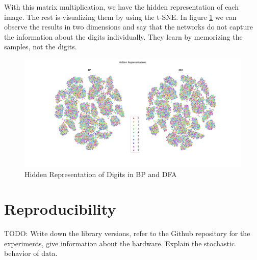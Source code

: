\documentclass[a4paper, nobind]{templates/ociamthesis}
\newcommand*{\bibtitle}{References}
\begin{document}
\noindent With this matrix multiplication, we have the hidden representation of each image. The rest is visualizing them by using the t-SNE. In figure \ref{fig:tSNEBPDFA} we can observe the results in two dimensions and say that the networks do not capture the information about the digits individually. They learn by memorizing the samples, not the digits.

\begin{figure}

{\centering \includegraphics[width=1\linewidth]{figures/B_tsne_BPDFA} 

}

\caption{Hidden Representation of Digits in BP and DFA}\label{fig:tSNEBPDFA}
\end{figure}

\hypertarget{reproducibility}{%
\chapter{Reproducibility}\label{reproducibility}}

TODO: Write down the library versions, refer to the Github repository for the experiments, give information about the hardware. Explain the stochastic behavior of data.


\setlength{\baselineskip}{0pt} %

{\renewcommand*\MakeUppercase[1]{#1}%
\printbibliography[heading=bibintoc,title={\bibtitle}]}
\end{document}
